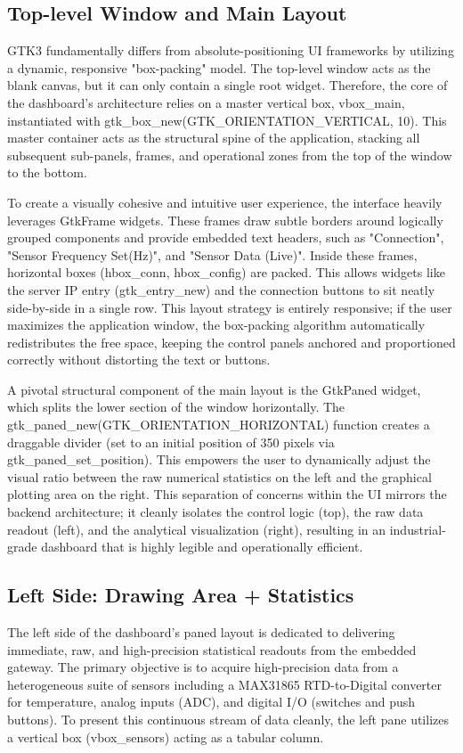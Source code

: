 \subsection{Top-level Window and Main Layout}
GTK3 fundamentally differs from absolute-positioning UI frameworks by utilizing a dynamic, responsive "box-packing" model. The top-level window acts as the blank canvas, but it can only contain a single root widget. Therefore, the core of the dashboard's architecture relies on a master vertical box, vbox\_main, instantiated with gtk\_box\_new(GTK\_ORIENTATION\_VERTICAL, 10). This master container acts as the structural spine of the application, stacking all subsequent sub-panels, frames, and operational zones from the top of the window to the bottom.

To create a visually cohesive and intuitive user experience, the interface heavily leverages GtkFrame widgets. These frames draw subtle borders around logically grouped components and provide embedded text headers, such as "Connection", "Sensor Frequency Set(Hz)", and "Sensor Data (Live)". Inside these frames, horizontal boxes (hbox\_conn, hbox\_config) are packed. This allows widgets like the server IP entry (gtk\_entry\_new) and the connection buttons to sit neatly side-by-side in a single row. This layout strategy is entirely responsive; if the user maximizes the application window, the box-packing algorithm automatically redistributes the free space, keeping the control panels anchored and proportioned correctly without distorting the text or buttons.

A pivotal structural component of the main layout is the GtkPaned widget, which splits the lower section of the window horizontally. The gtk\_paned\_new(GTK\_ORIENTATION\_HORIZONTAL) function creates a draggable divider (set to an initial position of 350 pixels via gtk\_paned\_set\_position). This empowers the user to dynamically adjust the visual ratio between the raw numerical statistics on the left and the graphical plotting area on the right. This separation of concerns within the UI mirrors the backend architecture; it cleanly isolates the control logic (top), the raw data readout (left), and the analytical visualization (right), resulting in an industrial-grade dashboard that is highly legible and operationally efficient.


\subsection{Left Side: Drawing Area + Statistics}
The left side of the dashboard's paned layout is dedicated to delivering immediate, raw, and high-precision statistical readouts from the embedded gateway. The primary objective is to acquire high-precision data from a heterogeneous suite of sensors including a MAX31865 RTD-to-Digital converter for temperature, analog inputs (ADC), and digital I/O (switches and push buttons). To present this continuous stream of data cleanly, the left pane utilizes a vertical box (vbox\_sensors) acting as a tabular column.

